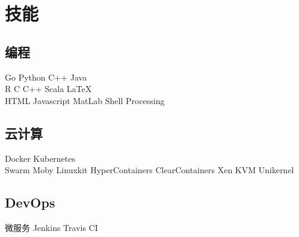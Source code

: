 \documentclass[]{deedy-resume-openfont}
\begin{document}
\begin{minipage}[t]{0.25\textwidth}
    
    
    
    \section{技能}
    \sectionsep
    \subsection{编程}
    Go \textbullet{} Python \textbullet{} C++ \textbullet{} Java \\
    R \textbullet{} C \textbullet{} C++ \textbullet{} Scala \textbullet{} \LaTeX\ \\
    HTML \textbullet{} Javascript \textbullet{} MatLab \textbullet{} Shell \textbullet{} Processing \\ 
    \sectionsep

    \subsection{云计算}
    Docker \textbullet{} Kubernetes \\
    Swarm \textbullet{} Moby \textbullet{} Linuxkit \textbullet{} HyperContainers \textbullet{} ClearContainers \textbullet{} Xen \textbullet{} KVM \textbullet{} Unikernel \\
    \sectionsep
    
    \subsection{DevOps}
    微服务 \textbullet{} Jenkins \textbullet{} Travis CI

    
    \end{minipage} 
\end{document}
